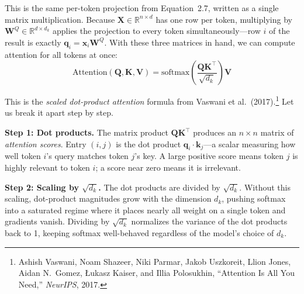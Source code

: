 This is the same per-token projection from Equation~2.7, written as a single matrix multiplication. Because $\mathbf{X} \in \mathbb{R}^{n \times d}$ has one row per token, multiplying by $\mathbf{W}^Q \in \mathbb{R}^{d \times d_k}$ applies the projection to every token simultaneously---row $i$ of the result is exactly $\mathbf{q}_i = \mathbf{x}_i\mathbf{W}^Q$. With these three matrices in hand, we can compute attention for all tokens at once:
\begin{equation}
\label{eq:attention}
\text{Attention}(\mathbf{Q}, \mathbf{K}, \mathbf{V}) = \text{softmax}\!\left(\frac{\mathbf{Q}\mathbf{K}^\top}{\sqrt{d_k}}\right)\mathbf{V}
\end{equation}

This is the \emph{scaled dot-product attention} formula from Vaswani et al.\ (2017).\footnote{Ashish Vaswani, Noam Shazeer, Niki Parmar, Jakob Uszkoreit, Llion Jones, Aidan N.\ Gomez, {\L}ukasz Kaiser, and Illia Polosukhin, ``Attention Is All You Need,'' \emph{NeurIPS}, 2017.} Let us break it apart step by step.

\textbf{Step 1: Dot products.}\hspace{1em} The matrix product $\mathbf{Q}\mathbf{K}^\top$ produces an $n \times n$ matrix of \emph{attention scores}. Entry $(i, j)$ is the dot product $\mathbf{q}_i \cdot \mathbf{k}_j$---a scalar measuring how well token $i$'s query matches token $j$'s key. A large positive score means token $j$ is highly relevant to token $i$; a score near zero means it is irrelevant.

%
\textbf{Step 2: Scaling by $\sqrt{d_k}$.}\hspace{1em} The dot products are divided by $\sqrt{d_k}$. Without this scaling, dot-product magnitudes grow with the dimension $d_k$, pushing softmax into a saturated regime where it places nearly all weight on a single token and gradients vanish. Dividing by $\sqrt{d_k}$ normalizes the variance of the dot products back to 1, keeping softmax well-behaved regardless of the model's choice of $d_k$.

